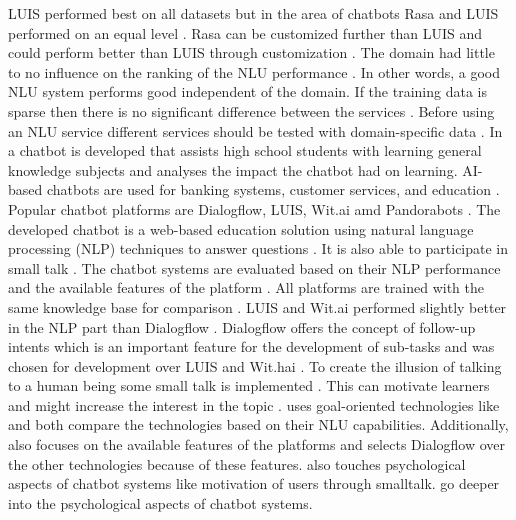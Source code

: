 LUIS performed best on all datasets but in the area of chatbots Rasa and LUIS performed on an equal level \cite{braunEvaluatingNLU}.
Rasa can be customized further than LUIS and could perform better than LUIS through customization \cite{braunEvaluatingNLU}. 
The domain had little to no influence on the ranking of the NLU performance \cite{braunEvaluatingNLU}.
In other words, a good NLU system performs good independent of the domain.
If the training data is sparse then there is no significant difference between the services \cite{braunEvaluatingNLU}. 
Before using an NLU service different services should be tested with domain-specific data \cite{braunEvaluatingNLU}.
In \citet{dutta2017developing} a chatbot is developed that assists high school students with learning general 
knowledge subjects and analyses the impact the chatbot had on learning.
AI-based chatbots are used for banking systems, customer services, and education \cite{dutta2017developing}.
Popular chatbot platforms are Dialogflow, LUIS, Wit.ai amd Pandorabots \cite{dutta2017developing}.
The developed chatbot is a web-based education solution using natural language processing (NLP) techniques
to answer questions \cite{dutta2017developing}.
It is also able to participate in small talk \cite{dutta2017developing}.
The chatbot systems are evaluated based on their NLP performance and the available features of the platform 
\cite{dutta2017developing}. 
All platforms are trained with the same knowledge base for comparison \cite{dutta2017developing}. 
LUIS and Wit.ai performed slightly better in the NLP part than Dialogflow \cite{dutta2017developing}.
Dialogflow offers the concept of follow-up intents which is an important feature for the development 
of sub-tasks and was chosen for development over LUIS and Wit.hai \cite{dutta2017developing}.
To create the illusion of talking to a human being some small talk is implemented \cite{dutta2017developing}. 
This can motivate learners and might increase the interest in the topic \cite{dutta2017developing}.
\citet{dutta2017developing} uses goal-oriented technologies like \citet{braunEvaluatingNLU} and 
both compare the technologies based on their NLU capabilities.
Additionally, \citet{dutta2017developing} also focuses on the available features of the 
platforms and selects Dialogflow over the other technologies because 
of these features.
\citet{dutta2017developing} also touches psychological aspects of chatbot systems 
like motivation of users through smalltalk. 
\citet{GO2019304, brandtzaeg2018chatbots,folstad2017chatbots} go deeper into the psychological aspects of chatbot systems.
